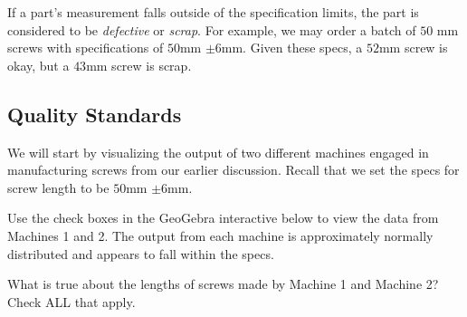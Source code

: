 \documentclass{ximera}
\begin{document}
\begin{center}
      \end{center}

If a part's measurement falls outside of the specification limits, the part is considered to be \emph{defective} or \emph{scrap}.  For example, we may order a batch of $50$ mm screws with specifications of $50$mm $\pm 6$mm.   Given these specs, a $52$mm screw is okay, but a $43$mm screw is scrap.

\subsection*{Quality Standards}
We will start by visualizing the output of two different machines engaged in manufacturing screws from our earlier discussion.  Recall that we set the specs for screw length to be $50$mm $\pm 6$mm.  

Use the check boxes in the GeoGebra interactive below to view the data from Machines 1 and 2.  The output from each machine is approximately normally distributed and appears to fall within the specs.  

\begin{onlineOnly}
\begin{center} 
\end{center}
\end{onlineOnly}

\begin{question}\label{quest:compareMachines}
    What is true about the lengths of screws made by Machine 1 and Machine 2?  Check ALL that apply.
    \begin{selectAll}
    \end{selectAll}
\end{question}
\end{document}
